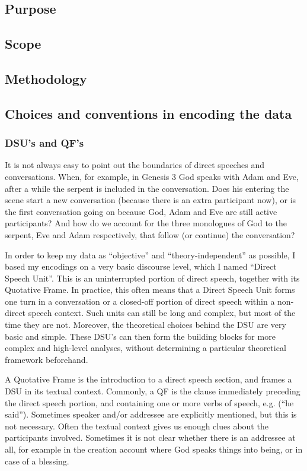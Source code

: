\documentclass[twoside,a4paper,10pt]{article}
\begin{document}
\subsection{Purpose}
\subsection{Scope}
\subsection{Methodology}
\subsection{Choices and conventions in encoding the data}
\subsubsection{DSU's and QF's}
It is not always easy to point out the boundaries of direct speeches and conversations. When, for example, in Genesis 3 God speaks with Adam and Eve, after a while the serpent is included in the conversation. Does his entering the scene start a new conversation (because there is an extra participant now), or is the first conversation going on because God, Adam and Eve are still active participants? And how do we account for the three monologues of God to the serpent, Eve and Adam respectively, that follow (or continue) the conversation?

In order to keep my data as ``objective'' and ``theory-independent'' as possible, I based my encodings on a very basic discourse level, which I named ``Direct Speech Unit''. This is an uninterrupted portion of direct speech, together with its Quotative Frame. In practice, this often means that a Direct Speech Unit forms one turn in a conversation or a closed-off portion of direct speech within a non-direct speech context. Such units can still be long and complex, but most of the time they are not. Moreover, the theoretical choices behind the DSU are very basic and simple. These DSU's can then form the building blocks for more complex and high-level analyses, without determining a particular theoretical framework beforehand. 

A Quotative Frame is the introduction to a direct speech section, and frames a DSU in its textual context. Commonly, a QF is the clause immediately preceding the direct speech portion, and containing one or more verbs of speech, e.g.  (``he said''). Sometimes speaker and/or addressee are explicitly mentioned, but this is not necessary. Often the textual context gives us enough clues about the participants involved. Sometimes it is not clear whether there is an addressee at all, for example in the creation account where God speaks things into being, or in case of a blessing.
\end{document}

